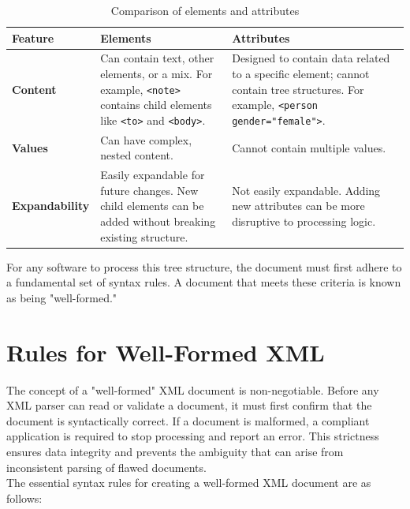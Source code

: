 \documentclass{scrbook}
\begin{document}
\begin{table}
    \centering
    \begin{tabularx}{\textwidth}{|X|X|X|} \hline
        Feature & Elements & Attributes \\ \hline

        \textbf{Content} &
        Can contain text, other elements, or a mix. For example, \texttt{\textless note\textgreater} contains child elements like \texttt{\textless to\textgreater} and \texttt{\textless body\textgreater}. &
        Designed to contain data related to a specific element; cannot contain tree structures. For example, \texttt{\textless person gender="female"\textgreater}. \\ \hline

        \textbf{Values} &
        Can have complex, nested content. &
        Cannot contain multiple values. \\ \hline

        \textbf{Expandability} &
        Easily expandable for future changes. New child elements can be added without breaking existing structure. &
        Not easily expandable. Adding new attributes can be more disruptive to processing logic. \\ \hline

    \end{tabularx}
    \caption{Comparison of elements and attributes}
\end{table}

For any software to process this tree structure, the document must first adhere to a fundamental set of syntax rules. A document that meets these criteria is known as being "well-formed."

\section{Rules for Well-Formed XML}

The concept of a "well-formed" XML document is non-negotiable. Before any XML parser can read or validate a document, it must first confirm that the document is syntactically correct. If a document is malformed, a compliant application is required to stop processing and report an error. This strictness ensures data integrity and prevents the ambiguity that can arise from inconsistent parsing of flawed documents. \\

The essential syntax rules for creating a well-formed XML document are as follows:
\end{document}
